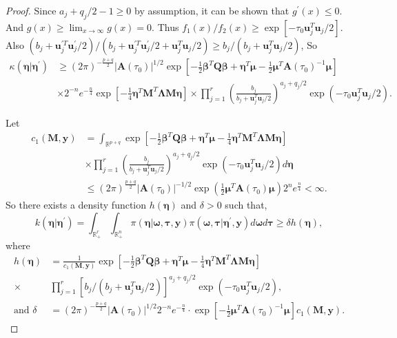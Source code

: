 \documentclass[11pt,a4paper]{article}
\begin{document}
\begin{proof}
Since $a_{j}+q_{j}/2-1\geq 0$ by assumption, it can be shown that $g^{\prime}\left(x\right)\leq 0$. And $
g\left(x\right)\geq\lim_{x\rightarrow\infty}g\left(x\right)=0$. Thus $f_{1}\left(x\right)/f_{2}\left(x\right)\geq\exp\left[-\tau_{0}\bm{u}_{j}^{T}\bm{u}_{j}/2\right]$. Also $
(b_{j}+\bm{u}_{j}^{\prime T}\bm{u}_{j}^{\prime}/2)/(b_{j}+\bm{u}_{j}^{\prime T}\bm{u}_{j}^{\prime}/2+\bm{u}_{j}^{T}\bm{u}_{j}/2)\geq b_{j}/(b_{j}+\bm{u}_{j}^{T}\bm{u}_{j}/2)$, 
So 
\begin{align*}
\kappa (\bm{\eta} \vert \bm{\eta}^{\prime})& \geq\left(2\pi\right)^{-\frac{p+q}{2}}\left|\bm{A}\left(\tau_{0}\right)\right|^{1/2}\exp\left[-\frac{1}{2}\bm{\beta}^{T}\bm{Q}\bm{\beta}+\bm{\eta}^{T}\bm{\mu}-\frac{1}{2}\bm{\mu}^{T}\bm{A}\left(\tau_{0}\right)^{-1}\bm{\mu}\right]\\
& \times 2^{-n}e^{-\frac{n}{4}}\exp\left[-\frac{1}{4}\bm{\eta}^{T}\bm{M}^{T}\bm{\Lambda}\bm{M}\bm{\eta}\right] \times \prod_{j=1}^{r}\left(\frac{b_{j}}{b_{j}+\bm{u}_{j}^{T}\bm{u}_{j}/2}\right)^{a_{j}+q_{j}/2}\exp\left(-\tau_{0}\bm{u}_{j}^{T}\bm{u}_{j}/2\right).
\end{align*}

Let 
\begin{align*}
c_1\left(\bm{M},\bm{y}\right) & =\int_{\mathbb{R}^{p+q}}\exp\left[-\frac{1}{2}\bm{\beta}^{T}\bm{Q}\bm{\beta}+\bm{\eta}^{T}\bm{\mu}-\frac{1}{4}\bm{\eta}^{T}\bm{M}^{T}\bm{\Lambda}\bm{M}\bm{\eta}\right]\\
& \times \prod_{j=1}^{r}\left(\frac{b_{j}}{b_{j}+\bm{u}_{j}^{T}\bm{u}_{j}/2}\right)^{a_{j}+q_{j}/2}\exp\left(-\tau_{0}\bm{u}_{j}^{T}\bm{u}_{j}/2\right)d\bm{\eta}\\
& \leq \left(2\pi\right)^{\frac{p+q}{2}}\left|\bm{A}\left(\tau_{0}\right)\right|^{-1/2} \exp\left( \frac{1}{2} \bm{\mu}^T \bm{A}\left(\tau_{0}\right) \bm{\mu} \right)2^n e^{\frac{n}{4}}  < \infty.
\end{align*}
So there exists a density function $h\left(\bm{\eta}\right)$ and $\delta>0$ such that,
\[
k(\bm{\eta}|\bm{\eta}^{\prime}) = \int_{\mathbb{R}_+^{r}}\int_{\mathbb{R}_{+}^{n}}\pi(\bm{\eta}|\bm{\omega},\bm{\tau},\bm{y})\pi(\bm{\omega,\tau}|\bm{\eta}^{\prime},\bm{y})d\bm{\omega}d\bm{\tau}\geq\delta h\left(\bm{\eta}\right),
\]
where 
\begin{align*}
h\left(\bm{\eta}\right) & =\frac{1}{c_1\left(\bm{M},\bm{y}\right)}\exp\left[-\frac{1}{2}\bm{\beta}^{T}\bm{Q}\bm{\beta}+\bm{\eta}^{T}\bm{\mu}-\frac{1}{4}\bm{\eta}^{T}\bm{M}^{T}\bm{\Lambda}\bm{M}\bm{\eta}\right]\\
\times & \prod_{j=1}^{r}\left[b_{j}/(b_{j}+\bm{u}_{j}^{T}\bm{u}_{j}/2)\right]^{a_{j}+q_{j}/2}\exp\left(-\tau_{0}\bm{u}_{j}^{T}\bm{u}_{j}/2\right),\\
\text{and } \delta & =\left(2\pi\right)^{-\frac{p+q}{2}}\left|\bm{A}\left(\tau_{0}\right)\right|^{1/2}2^{-n}e^{-\frac{n}{4}}\cdot\exp\left[-\frac{1}{2}\bm{\mu}^{T}\bm{A}\left(\tau_{0}\right)^{-1}\bm{\mu}\right]c_1\left(\bm{M},\bm{y}\right).
\end{align*}


\end{proof}
\end{document}
